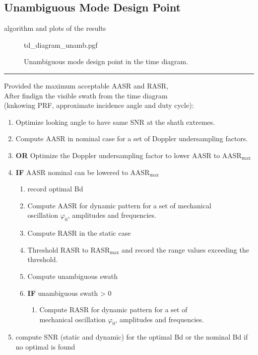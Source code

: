 \documentclass[11pt, a4paper]{scrartcl}
\begin{document}
    \subsection{Unambiguous Mode Design Point}
    \label{subsec:unambiguous_mode_design_point}
    algorithm and plots of the results\\
    \begin{figure}[!htb]
        \centering
        {td_diagram_unamb.pgf}
        \caption{Unambiguous mode design point in the time diagram.
        }
        \label{fig:unambigmode}
    \end{figure}
    \FloatBarrier
    \noindent\rule{\textwidth}{0.4pt}
    \begin{ttfamily}
        \small
        Provided the maximum acceptable AASR and RASR,\\
        After findign the visible swath from the time diagram \\(knkowing PRF, approximate incidence angle and duty cycle):
        \begin{enumerate}
            \item Optimize looking angle to have same SNR at the shath extremes.
            \item Compute AASR in nominal case for a set of Doppler undersampling factors.
            \item \textbf{OR} Optimize the Doppler undersampling factor to lower AASR to AASR$_{\text{max}}$
            \item \textbf{IF} AASR nominal can be lowered to AASR$_{\text{max}}$
            \begin{enumerate}
                \item record optimal Bd
                \item Compute AASR for dynamic pattern for a set of mechanical \\oscillation $\varphi_0$, amplitudes and frequencies.
                \item Compute RASR in the static case
                \item Threshold RASR to RASR$_{\text{max}}$ and record the range values exceeding the threshold.
                \item Compute unambiguous swath
                \item \textbf{IF} unambiguous swath > 0
                \begin{enumerate}
                    \item Compute RASR for dynamic pattern for a set of \\mechanical oscillation $\varphi_0$, amplitudes and frequencies.
                \end{enumerate}
            \end{enumerate}
            \item compute SNR (static and dynamic) for the optimal Bd or the nominal Bd if no optimal is found
        \end{enumerate}
    \end{ttfamily}
\end{document}
